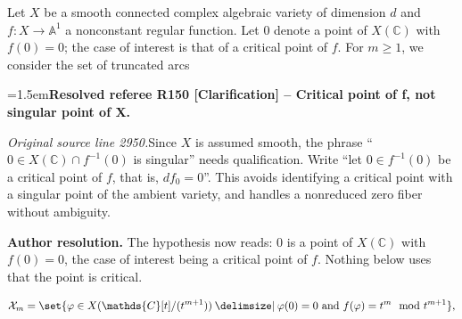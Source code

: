 \documentclass[12pt]{amsart}
\newcommand{\ResolvedRefereeRemark}[5]{%
  \par\medskip\begingroup\normalfont\small\color{gray}%
  \emergencystretch=1.5em\noindent\textbf{Resolved referee R#1 [#2] -- #3.}\par\nobreak\noindent #4\par
  \medskip\color{ResolutionGreen}\noindent\textbf{Author resolution.} #5\par
  \endgroup\medskip
}
\theoremstyle{plain}
\theoremstyle{definition}
\theoremstyle{remark}
\numberwithin{equation}{section}
\theoremstyle{plain}
\newcommand{\A}{\mathds{A}}
\newcommand{\C}{\mathds{C}}
\newcommand{\0}{\emptyset}
\newcommand{\mdl}[1]{\mathcal{#1}}  %
\newcommand{\fun}{\longrightarrow}
\providecommand\given{}
\newcommand\SetSymbol[1][]{%
\nonscript \: #1 \vert
\allowbreak
\nonscript\:
\mathopen{}}
\renewcommand\given{\SetSymbol[\delimsize]}
\begin{document}
Let $X$ be a smooth connected complex algebraic variety of dimension $d$ and $f : X \fun \A^1$ a nonconstant regular function. Let $0$ denote a point of $X(\C)$ with $f(0) = 0$; the case of interest is that of a critical point of $f$. For $m \geq 1$, we consider the set of truncated arcs

\ResolvedRefereeRemark{150}{Clarification}{Critical point of f, not singular point of X}{%
\textit{Original source line 2950.}\quad Since $X$ is assumed smooth, the phrase ``$0\in X(\C)\cap f^{-1}(0)$ is singular'' needs qualification. Write ``let $0\in f^{-1}(0)$ be a critical point of $f$, that is, $df_0=0$''. This avoids identifying a critical point with a singular point of the ambient variety, and handles a nonreduced zero fiber without ambiguity.
}{The hypothesis now reads: $0$ is a point of $X(\C)$ with $f(0)=0$, the case of interest being a critical point of $f$. Nothing below uses that the point is critical.}
\begin{equation}\label{f:m:arc}
\mdl X_{m} = \set{ \varphi \in X(\C[t] / (t^{m+1})) \given \varphi(0) = 0 \text{ and } f(\varphi) = t^m \mod t^{m+1}},
\end{equation}
\end{document}
